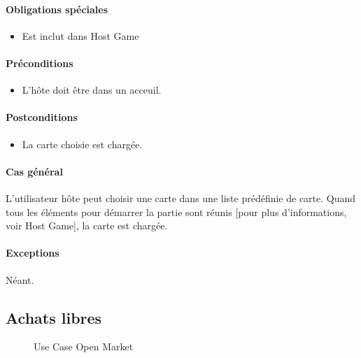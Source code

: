 \documentclass[a4paper,11pt]{report}
\begin{document}
\paragraph{Obligations spéciales}
\begin{itemize}
 \item Est inclut dans Host Game
\end{itemize}
\paragraph{Préconditions}
\begin{itemize}
 \item L'hôte doit être dans un acceuil.
\end{itemize}
\paragraph{Postconditions}
\begin{itemize}
 \item La carte choisie est chargée.
\end{itemize}
\paragraph{Cas général}
L'utilisateur hôte peut choisir une carte dans une liste prédéfinie de carte. Quand tous les éléments pour démarrer la partie
sont réunis [pour plus d'informations, voir Host Game], la carte est chargée.
\paragraph{Exceptions} Néant.

\newpage
\subsection{Achats libres}
\begin{figure}[ht]
    \caption{Use Case Open Market}
\end{figure}
\end{document}
